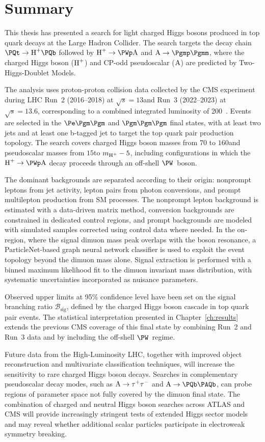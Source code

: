 \chapter{Summary}
\label{ch:conclusion}

This thesis has presented a search for light charged Higgs bosons produced in top quark decays at the Large Hadron Collider. The search targets the decay chain $\PQt \to \PHp\PQb$ followed by $\PHp \to \PWp\PA$ and $\PA \to \Pgmp\Pgmm$, where the charged Higgs boson ($\text{H}^+$) and CP-odd pseudoscalar ($\text{A}$) are predicted by Two-Higgs-Doublet Models.

The analysis uses proton-proton collision data collected by the CMS experiment during LHC Run~2 (2016--2018) at $\sqrt{s} = 13$\TeV and Run~3 (2022--2023) at $\sqrt{s} = 13.6$\TeV, corresponding to a combined integrated luminosity of 200~\fbinv. Events are selected in the $\Pe\Pgm\Pgm$ and $\Pgm\Pgm\Pgm$ final states, with at least two jets and at least one b-tagged jet to target the top quark pair production topology. The search covers charged Higgs boson masses from $70$ to $160$\GeV and pseudoscalar masses from $15$\GeV to $m_{\text{H}^+} - 5$\GeV, including configurations in which the $\PHp \to \PWp\PA$ decay proceeds through an off-shell $\PW$~boson.

The dominant backgrounds are separated according to their origin: nonprompt leptons from jet activity, lepton pairs from photon conversions, and prompt multilepton production from SM processes. The nonprompt lepton background is estimated with a data-driven matrix method, conversion backgrounds are constrained in dedicated control regions, and prompt backgrounds are modeled with simulated samples corrected using control data where needed. In the on-\PZ region, where the signal dimuon mass peak overlaps with the \PZ boson resonance, a ParticleNet-based graph neural network classifier is used to exploit the event topology beyond the dimuon mass alone. Signal extraction is performed with a binned maximum likelihood fit to the dimuon invariant mass distribution, with systematic uncertainties incorporated as nuisance parameters.

Observed upper limits at 95\% confidence level have been set on the signal branching ratio $\mathcal{B}_{\text{sig}}$, defined by the charged Higgs boson cascade in top quark pair events. The statistical interpretation presented in Chapter~\ref{ch:results} extends the previous CMS coverage of this final state by combining Run~2 and Run~3 data and by including the off-shell $\PW$~regime.

Future data from the High-Luminosity LHC, together with improved object reconstruction and multivariate classification techniques, will increase the sensitivity to rare charged Higgs boson decays. Searches in complementary pseudoscalar decay modes, such as $\text{A} \to \tau^+\tau^-$ and $\PA \to \PQb\PAQb$, can probe regions of parameter space not fully covered by the dimuon final state. The combination of charged and neutral Higgs boson searches across ATLAS and CMS will provide increasingly stringent tests of extended Higgs sector models and may reveal whether additional scalar particles participate in electroweak symmetry breaking.
